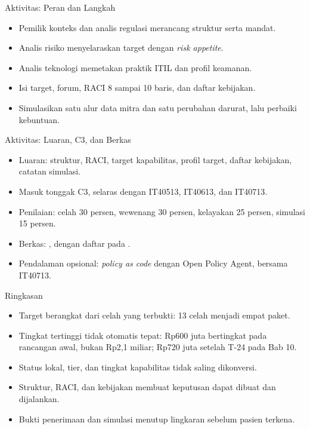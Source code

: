 \documentclass[aspectratio=169, table, 12pt]{beamer}
\begin{document}
\begin{frame}{{\Large Aktivitas: Peran dan Langkah}}
  \vspace{6pt}
  \small
  \begin{itemize}
    \item Pemilik konteks dan analis regulasi merancang struktur serta mandat.
    \item Analis risiko menyelaraskan target dengan \textit{risk appetite}.
    \item Analis teknologi memetakan praktik ITIL dan profil keamanan.
    \item Isi target, forum, RACI 8 sampai 10 baris, dan daftar kebijakan.
    \item Simulasikan satu alur data mitra dan satu perubahan darurat, lalu perbaiki kebuntuan.
  \end{itemize}
\end{frame}

\begin{frame}{{\Large Aktivitas: Luaran, C3, dan Berkas}}
  \vspace{6pt}
  \small
  \begin{itemize}
    \item Luaran: struktur, RACI, target kapabilitas, profil target, daftar kebijakan, catatan
          simulasi.
    \item Masuk tonggak C3, selaras dengan IT40513, IT40613, dan IT40713.
    \item Penilaian: celah 30 persen, wewenang 30 persen, kelayakan 25 persen, simulasi 15 persen.
    \item Berkas: , dengan daftar pada .
    \item Pendalaman opsional: \textit{policy as code} dengan Open Policy Agent, bersama IT40713.
  \end{itemize}
\end{frame}

\begin{frame}{{\Large Ringkasan}}
  \vspace{6pt}
  \small
  \begin{itemize}
    \item Target berangkat dari celah yang terbukti: 13 celah menjadi empat paket.
    \item Tingkat tertinggi tidak otomatis tepat: Rp600 juta bertingkat pada rancangan awal, bukan
          Rp2,1 miliar; Rp720 juta setelah T-24 pada Bab 10.
    \item Status lokal, tier, dan tingkat kapabilitas tidak saling dikonversi.
    \item Struktur, RACI, dan kebijakan membuat keputusan dapat dibuat dan dijalankan.
    \item Bukti penerimaan dan simulasi menutup lingkaran sebelum pasien terkena.
  \end{itemize}
\end{frame}
\end{document}
